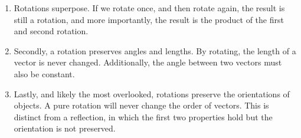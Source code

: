 \begin{enumerate}
    \item  Rotations superpose. If we rotate once, and then rotate again, the result is still a rotation, and more importantly, the result is the product of the first and second rotation.
    \item Secondly, a rotation preserves angles and lengths. By rotating, the length of a vector is never changed. Additionally, the angle between two vectors must also be constant.
    \item Lastly, and likely the most overlooked, rotations preserve the orientations of objects. A pure rotation will never change the order of vectors. This is distinct from a reflection, in which the first two properties hold but the orientation is not preserved.


\end{enumerate}


